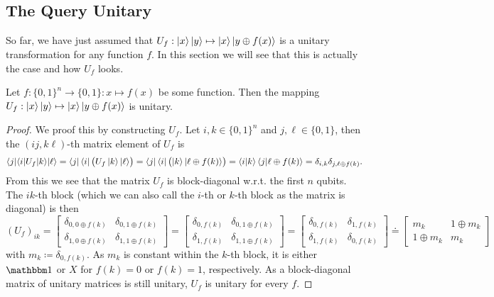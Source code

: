 		\subsection{The Query Unitary} %
			\label{subsec:queryUnitary}

			So far, we have just assumed that \( U_f : \ket{x}\ket{y} \mapsto \ket{x}\ket{y \oplus f(x)} \) is a unitary transformation for any function \(f\). In this section we will see that this is actually the case and how \(U_f\) looks.

			\begin{theorem}
				Let \( f : \{ 0, 1 \}^n \to \{ 0, 1 \} : x \mapsto f(x) \) be some function. Then the mapping \( U_f : \ket{x}\ket{y} \mapsto \ket{x}\ket{y \oplus f(x)} \) is unitary.
			\end{theorem}
			\begin{proof}
				We proof this by constructing \(U_f\). Let \( i, k \in \{ 0, 1 \}^n \) and \( j, \ell \in \{ 0, 1 \} \), then the \( (ij, k\ell) \)-th matrix element of \(U_f\) is
				\begin{equation}
					\bra{j}\!\!\mel{i}{U_f}{k}\!\ket{\ell}
						= \bra{j} \bra{i} \bigl( U_f \ket{k} \ket{\ell} \bigr)
						= \bra{j} \bra{i} \bigl( \ket{k} \ket{\ell \oplus f(k)} \bigr)
						= \braket{i}{k} \braket{j}{\ell \oplus f(k)}
						= \delta_{i, k} \delta_{j, \ell \oplus f(k)}.
				\end{equation}
				From this we see that the matrix \(U_f\) is block-diagonal w.r.t. the first \(n\) qubits. The \(ik\)-th block (which we can also call the \(i\)-th or \(k\)-th block as the matrix is diagonal) is then
				\begin{equation}
					(U_f)_{ik}
					=
					\begin{bmatrix}
						\delta_{0, 0 \oplus f(k)} & \delta_{0, 1 \oplus f(k)} \\
						\delta_{1, 0 \oplus f(k)} & \delta_{1, 1 \oplus f(k)}
					\end{bmatrix}
					=
					\begin{bmatrix}
						\delta_{0, f(k)} & \delta_{0, 1 \oplus f(k)} \\
						\delta_{1, f(k)} & \delta_{1, 1 \oplus f(k)}
					\end{bmatrix}
					=
					\begin{bmatrix}
						\delta_{0, f(k)} & \delta_{1, f(k)} \\
						\delta_{1, f(k)} & \delta_{0, f(k)}
					\end{bmatrix}
					\doteq
					\begin{bmatrix}
						m_k & 1 \oplus m_k \\
						1 \oplus m_k & m_k
					\end{bmatrix}
				\end{equation}
				with \( m_k \coloneqq \delta_{0, f(k)} \). As \(m_k\) is constant within the \(k\)-th block, it is either \(\ID\) or \(X\) for \(f(k) = 0\) or \(f(k) = 1\), respectively. As a block-diagonal matrix of unitary matrices is still unitary, \(U_f\) is unitary for every \(f\).
			\end{proof}

